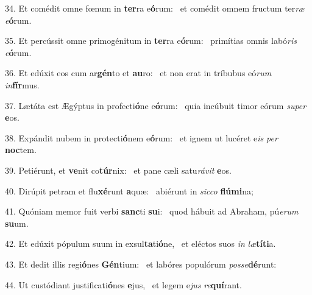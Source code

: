 34. Et comédit omne fœnum in \textbf{ter}ra e\textbf{ó}rum: \ast\  et comédit omnem fructum ter\textit{ræ} \textit{e}\textbf{ó}rum.\

35. Et percússit omne primogénitum in \textbf{ter}ra e\textbf{ó}rum: \ast\  primítias omnis labó\textit{ris} \textit{e}\textbf{ó}rum.\

36. Et edúxit eos cum ar\textbf{gén}to et \textbf{au}ro: \ast\  et non erat in tríbubus eó\textit{rum} \textit{in}\textbf{fír}mus.\

37. Lætáta est Ægýptus in profecti\textbf{ó}ne e\textbf{ó}rum: \ast\  quia incúbuit timor eórum \textit{su}\textit{per} \textbf{e}os.\

38. Expándit nubem in protecti\textbf{ó}nem e\textbf{ó}rum: \ast\  et ignem ut lucéret e\textit{is} \textit{per} \textbf{noc}tem.\

39. Petiérunt, et \textbf{ve}nit co\textbf{túr}nix: \ast\  et pane cæli satu\textit{rá}\textit{vit} \textbf{e}os.\

40. Dirúpit petram et flu\textbf{xé}runt \textbf{a}quæ: \ast\  abiérunt in \textit{sic}\textit{co} \textbf{flú}\textbf{mi}na;\

41. Quóniam memor fuit verbi \textbf{sanc}ti \textbf{su}i: \ast\  quod hábuit ad Abraham, pú\textit{e}\textit{rum} \textbf{su}um.\

42. Et edúxit pópulum suum in exsul\textbf{ta}ti\textbf{ó}ne, \ast\  et eléctos suos \textit{in} \textit{læ}\textbf{tí}\textbf{ti}a.\

43. Et dedit illis regi\textbf{ó}nes \textbf{Gén}tium: \ast\  et labóres populórum \textit{pos}\textit{se}\textbf{dé}runt:\

44. Ut custódiant justificati\textbf{ó}nes \textbf{e}jus, \ast\  et legem e\textit{jus} \textit{re}\textbf{quí}rant.\

